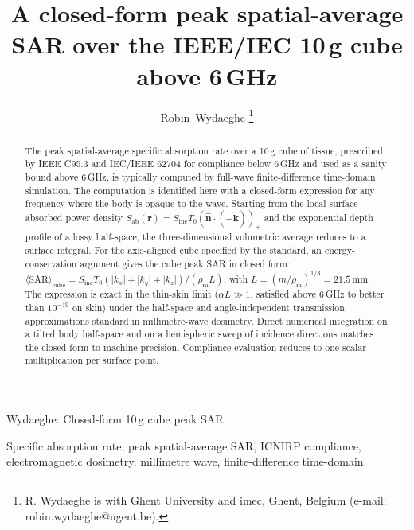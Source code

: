 \documentclass[journal,twocolumn,10pt]{IEEEtran}
\theoremstyle{plain}
\theoremstyle{remark}
\newcommand{\khat}{\hat{\bm{k}}}
\newcommand{\nhat}{\hat{\bm{n}}}
\newcommand{\rr}{\mathbf{r}}
\newcommand{\Sinc}{S_{\mathrm{inc}}}
\newcommand{\Sab}{S_{\mathrm{ab}}}
\newcommand{\rhom}{\rho_{\mathrm{m}}}
\newcommand{\pospart}[1]{\left(#1\right)_{+}}
\begin{document}
\title{A closed-form peak spatial-average {SAR} over the
{IEEE/IEC} 10\,g cube above 6\,{GHz}}

\author{Robin~Wydaeghe%
  \thanks{R. Wydaeghe is with Ghent University and imec, Ghent,
  Belgium (e-mail: robin.wydaeghe@ugent.be).}}

%
{Wydaeghe: Closed-form 10\,g cube peak SAR}

\maketitle

\begin{abstract}
The peak spatial-average specific absorption rate over a 10\,g cube
of tissue, prescribed by IEEE C95.3 and IEC/IEEE 62704 for
compliance below 6\,GHz and used as a sanity bound above 6\,GHz, is
typically computed by full-wave finite-difference time-domain
simulation. The computation is identified here with a closed-form
expression for any frequency where the body is opaque to the wave.
Starting from the local surface absorbed power density
$\Sab(\rr) = \Sinc T_0 \pospart{\nhat \cdot (-\khat)}$ and the
exponential depth profile of a lossy half-space, the three-dimensional
volumetric average reduces to a surface integral. For the
axis-aligned cube specified by the standard, an energy-conservation
argument gives the cube peak SAR in closed form:
$\langle\mathrm{SAR}\rangle_{\mathrm{cube}}
= \Sinc T_0 (|k_x|+|k_y|+|k_z|)/(\rhom L)$, with
$L=(m/\rhom)^{1/3} = 21.5\,$mm. The expression is exact in the
thin-skin limit ($\alpha L \gg 1$, satisfied above 6\,GHz to better
than $10^{-19}$ on skin) under the half-space and angle-independent
transmission approximations standard in millimetre-wave dosimetry.
Direct numerical integration on a tilted body half-space and on a
hemispheric sweep of incidence directions matches the closed form
to machine precision. Compliance evaluation reduces to one scalar
multiplication per surface point.
\end{abstract}

\begin{IEEEkeywords}
Specific absorption rate, peak spatial-average SAR, ICNIRP
compliance, electromagnetic dosimetry, millimetre wave,
finite-difference time-domain.
\end{IEEEkeywords}

\IEEEpeerreviewmaketitle
\end{document}
